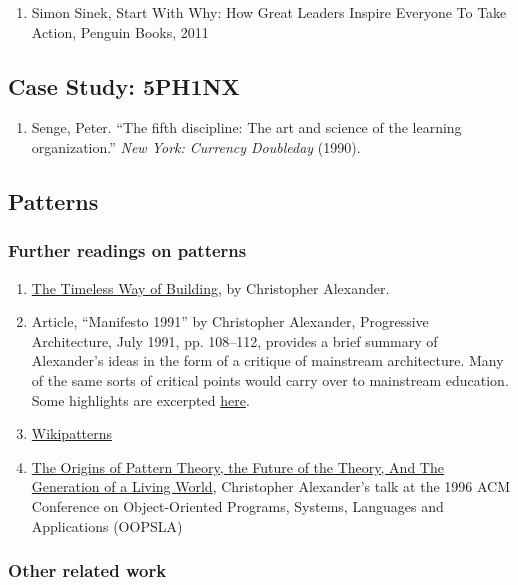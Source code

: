 \begin{enumerate}
\item
  Simon Sinek, Start With Why: How Great Leaders Inspire Everyone To
  Take Action, Penguin Books, 2011
\end{enumerate}
\subsection{Case Study: 5PH1NX}

\begin{enumerate}
\item
  Senge, Peter. ``The fifth discipline: The art and science of the
  learning organization.'' \emph{New York: Currency Doubleday} (1990).
\end{enumerate}
\subsection{Patterns}

\subsubsection{Further readings on patterns}

\begin{enumerate}
\item
  \href{http://en.wikipedia.org/wiki/The\_Timeless\_Way\_of\_Building}{The
  Timeless Way of Building}, by Christopher Alexander.
\item
  Article, ``Manifesto 1991'' by Christopher Alexander, Progressive
  Architecture, July 1991, pp. 108--112, provides a brief summary of
  Alexander's ideas in the form of a critique of mainstream
  architecture. Many of the same sorts of critical points would carry
  over to mainstream education. Some highlights are excerpted
  \href{https://plus.google.com/u/0/108598104736826154120/posts/agWYcqPhqSN}{here}.
\item
  \href{http://www.wikipatterns.com/display/wikipatterns/About}{Wikipatterns}
\item
  \href{http://www.patternlanguage.com/archive/ieee/ieeetext.htm}{The
  Origins of Pattern Theory, the Future of the Theory, And The
  Generation of a Living World}, Christopher Alexander's talk at the
  1996 ACM Conference on Object-Oriented Programs, Systems, Languages
  and Applications (OOPSLA)
\end{enumerate}
\subsubsection{Other related work}

